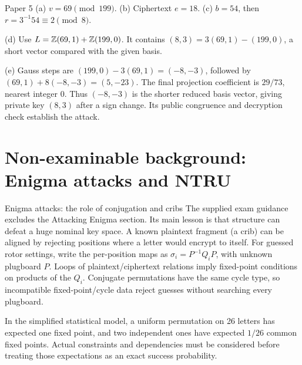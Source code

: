 \documentclass[11pt,a4paper]{article}
\begin{document}
\begin{answer}{Paper 5}
(a) \(v=69\pmod{199}\). (b) Ciphertext \(e=18\). (c) \(b=54\), then \(r=3^{-1}54\equiv2\pmod8\).

(d) Use \(L=\mathbb Z(69,1)+\mathbb Z(199,0)\). It contains \((8,3)=3(69,1)-(199,0)\), a short vector compared with the given basis.

(e) Gauss steps are \((199,0)-3(69,1)=(-8,-3)\), followed by \((69,1)+8(-8,-3)=(5,-23)\). The final projection coefficient is \(29/73\), nearest integer 0. Thus \((-8,-3)\) is the shorter reduced basis vector, giving private key \((8,3)\) after a sign change. Its public congruence and decryption check establish the attack.
\end{answer}
\section{Non-examinable background: Enigma attacks and NTRU}
\begin{concept}{Enigma attacks: the role of conjugation and cribs}
The supplied exam guidance excludes the Attacking Enigma section. Its main lesson is that structure can defeat a huge nominal key space. A known plaintext fragment (a crib) can be aligned by rejecting positions where a letter would encrypt to itself. For guessed rotor settings, write the per-position maps as \(\sigma_i=P^{-1}Q_iP\), with unknown plugboard \(P\). Loops of plaintext/ciphertext relations imply fixed-point conditions on products of the \(Q_i\). Conjugate permutations have the same cycle type, so incompatible fixed-point/cycle data reject guesses without searching every plugboard.

In the simplified statistical model, a uniform permutation on 26 letters has expected one fixed point, and two independent ones have expected \(1/26\) common fixed points. Actual constraints and dependencies must be considered before treating those expectations as an exact success probability.
\end{concept}
\end{document}
